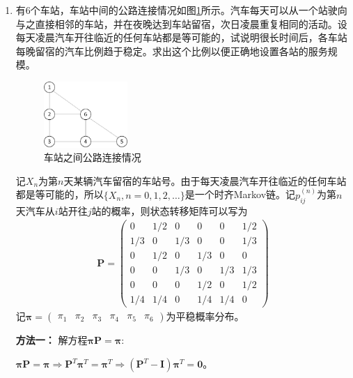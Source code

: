 \begin{enumerate}
	\item 有6个车站，车站中间的公路连接情况如图\ref{fig:road2}所示。汽车每天可以从一个站驶向与之直接相邻的车站，并在夜晚达到车站留宿，次日凌晨重复相同的活动。设每天凌晨汽车开往临近的任何车站都是等可能的，试说明很长时间后，各车站每晚留宿的汽车比例趋于稳定。求出这个比例以便正确地设置各站的服务规模。
	      \begin{figure}[h!]\label{fig:road2}
		      \begin{center}
			      \includegraphics[width=0.3\textwidth]{fig1.jpg}
			      \caption{车站之间公路连接情况}
		      \end{center}\end{figure}

	      记\(X_n\)为第\(n\)天某辆汽车留宿的车站号。由于每天凌晨汽车开往临近的任何车站都是等可能的，所以\(\{X_n,n=0,1,2,\ldots\}\)是一个时齐Markov链。记\(p_{ij}^{(n)}\)为第\(n\)天汽车从\(i\)站开往\(j\)站的概率，则状态转移矩阵可以写为
	      \begin{align*}
		      \mathbf{P}=\begin{pmatrix}
			                 0   & 1/2 & 0   & 0   & 0   & 1/2 \\
			                 1/3 & 0   & 1/3 & 0   & 0   & 1/3 \\
			                 0   & 1/2 & 0   & 1/3 & 0   & 0   \\
			                 0   & 0   & 1/3 & 0   & 1/3 & 1/3 \\
			                 0   & 0   & 0   & 1/2 & 0   & 1/2 \\
			                 1/4 & 1/4 & 0   & 1/4 & 1/4 & 0
		                 \end{pmatrix}
	      \end{align*}
	      记\(\boldsymbol{\pi}=\begin{pmatrix}\pi_1&\pi_2&\pi_3&\pi_4&\pi_5&\pi_6\end{pmatrix}\)为平稳概率分布。

	      \textbf{方法一：} 解方程\(\boldsymbol{\pi}\mathbf{P}=\boldsymbol{\pi}\):

	      \(\boldsymbol{\pi}\mathbf{P}=\boldsymbol{\pi}\Rightarrow \mathbf{P}^T\boldsymbol{\pi}^T=\boldsymbol{\pi}^T\Rightarrow (\mathbf{P}^T-\mathbf{I})\boldsymbol{\pi}^T=\mathbf{0}\)。


\end{enumerate}
